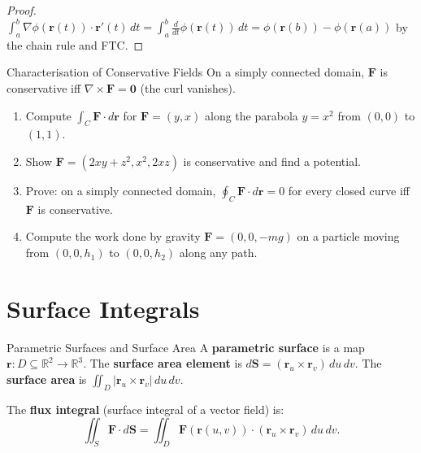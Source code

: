 \documentclass[12pt, openany]{book}
\theoremstyle{plain}
\theoremstyle{definition}
\theoremstyle{remark}
\newcommand{\R}{\mathbb{R}}
\begin{document}
\begin{proof}
$\int_a^b \nabla\phi(\mathbf{r}(t))\cdot\mathbf{r}'(t)\,dt
 = \int_a^b \frac{d}{dt}\phi(\mathbf{r}(t))\,dt
 = \phi(\mathbf{r}(b))-\phi(\mathbf{r}(a))$ by the chain rule and FTC.
\end{proof}

\begin{thmbox}{Characterisation of Conservative Fields}
On a simply connected domain, $\mathbf{F}$ is conservative iff
$\nabla\times\mathbf{F}=\mathbf{0}$ (the curl vanishes).
\end{thmbox}
\color{black}

\begin{exbox}
\begin{enumerate}
  \item Compute $\int_C \mathbf{F}\cdot d\mathbf{r}$ for $\mathbf{F}=(y,x)$ along
        the parabola $y=x^2$ from $(0,0)$ to $(1,1)$.
  \item Show $\mathbf{F}=(2xy+z^2,x^2,2xz)$ is conservative and find a potential.
  \item Prove: on a simply connected domain, $\oint_C \mathbf{F}\cdot d\mathbf{r}=0$
        for every closed curve iff $\mathbf{F}$ is conservative.
  \item Compute the work done by gravity $\mathbf{F}=(0,0,-mg)$ on a particle
        moving from $(0,0,h_1)$ to $(0,0,h_2)$ along any path.
\end{enumerate}
\end{exbox}
\color{black}

\chapter{Surface Integrals}
\color{black}

\begin{defbox}{Parametric Surfaces and Surface Area}
A \textbf{parametric surface} is a map $\mathbf{r}:D\subseteq\R^2\to\R^3$.
The \textbf{surface area element} is $d\mathbf{S}=(\mathbf{r}_u\times\mathbf{r}_v)\,du\,dv$.
The \textbf{surface area} is $\iint_D|\mathbf{r}_u\times\mathbf{r}_v|\,du\,dv$.

The \textbf{flux integral} (surface integral of a vector field) is:
\[\iint_S \mathbf{F}\cdot d\mathbf{S}
  = \iint_D \mathbf{F}(\mathbf{r}(u,v))\cdot(\mathbf{r}_u\times\mathbf{r}_v)\,du\,dv.\]
\end{defbox}
\color{black}
\end{document}
